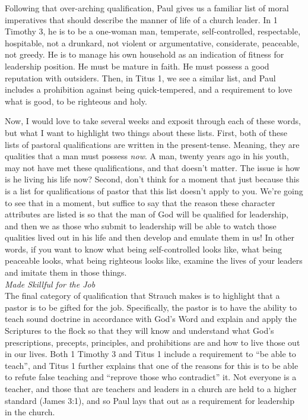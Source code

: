 \documentclass[letterpaper, 12pt]{article}
\begin{document}
    Following that over-arching qualification, Paul gives us a familiar
    list of moral imperatives that should describe the manner of life of
    a church leader. In 1 Timothy 3, he is to be a one-woman man,
    temperate, self-controlled, respectable, hospitable, not a drunkard,
    not violent or argumentative, considerate, peaceable, not greedy. He
    is to manage his own household as an indication of fitness for
    leadership position. He must be mature in faith. He must possess a
    good reputation with outsiders. Then, in Titus 1, we see a similar
    list, and Paul includes a prohibition against being quick-tempered,
    and a requirement to love what is good, to be righteous and holy.

    Now, I would love to take several weeks and exposit through each of
    these words, but what I want to highlight two things about these
    lists. First, both of these lists of pastoral qualifications are
    written in the present-tense. Meaning, they are qualities that a man
    must possess \emph{now}. A man, twenty years ago in his youth, may
    not have met these qualifications, and that doesn't matter. The
    issue is how is he living his life now? Second, don't think for a
    moment that just because this is a list for qualifications of pastor
    that this list doesn't apply to you. We're going to see that in a
    moment, but suffice to say that the reason these character
    attributes are listed is so that the man of God will be qualified
    for leadership, and then we as those who submit to leadership will
    be able to watch those qualities lived out in his life and then
    develop and emulate them in us! In other words, if you want to know
    what being self-controlled looks like, what being peaceable looks,
    what being righteous looks like, examine the lives of your leaders
    and imitate them in those things. \\

    \noindent \emph{Made Skillful for the Job} \\

    The final category of qualification that Strauch makes is to
    highlight that a pastor is to be gifted for the job. Specifically,
    the pastor is to have the ability to teach sound doctrine in
    accordance with God's Word and explain and apply the Scriptures to
    the flock so that they will know and understand what God's
    prescriptions, precepts, principles, and prohibitions are and how to
    live those out in our lives. Both 1 Timothy 3 and Titus 1 include a
    requirement to ``be able to teach'', and Titus 1 further explains
    that one of the reasons for this is to be able to refute false
    teaching and ``reprove those who contradict'' it. Not everyone is a
    teacher, and those that are teachers and leaders in a church are
    held to a higher standard (James 3:1), and so Paul lays that out as
    a requirement for leadership in the church. \\
\end{document}
